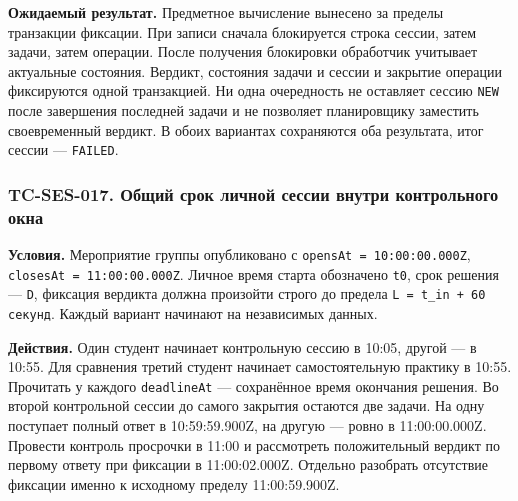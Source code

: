 \documentclass[12pt,a4paper]{article}
\begin{document}
\textbf{Ожидаемый результат.} Предметное вычисление вынесено за пределы транзакции фиксации. При записи сначала блокируется строка сессии, затем задачи, затем операции. После получения блокировки обработчик учитывает актуальные состояния. Вердикт, состояния задачи и сессии и закрытие операции фиксируются одной транзакцией. Ни одна очередность не оставляет сессию \texttt{NEW} после завершения последней задачи и не позволяет планировщику заместить своевременный вердикт. В обоих вариантах сохраняются оба результата, итог сессии --- \texttt{FAILED}.

\subsubsection{TC-SES-017. Общий срок личной сессии внутри контрольного окна}\label{tc-ses-017-ux43eux431ux449ux438ux439-ux441ux440ux43eux43a-ux43bux438ux447ux43dux43eux439-ux441ux435ux441ux441ux438ux438-ux432ux43dux443ux442ux440ux438-ux43aux43eux43dux442ux440ux43eux43bux44cux43dux43eux433ux43e-ux43eux43aux43dux430}

\hypertarget{tc-ses-017-общий-срок-личной-сессии-внутри-контрольного-окна}{}

\hypertarget{tc-ses-017}{}

\textbf{Условия.} Мероприятие группы опубликовано с \texttt{opens\allowbreak{}At =\allowbreak{} 10:00:00.\allowbreak{}000Z}, \texttt{closes\allowbreak{}At =\allowbreak{} 11:00:00.\allowbreak{}000Z}. Личное время старта обозначено \texttt{t0}, срок решения --- \texttt{D}, фиксация вердикта должна произойти строго до предела \texttt{L =\allowbreak{} t\_\allowbreak{}in + 60 секунд}. Каждый вариант начинают на независимых данных.

\textbf{Действия.} Один студент начинает контрольную сессию в 10:05, другой --- в 10:55. Для сравнения третий студент начинает самостоятельную практику в 10:55. Прочитать у каждого \texttt{deadlineAt} --- сохранённое время окончания решения. Во второй контрольной сессии до самого закрытия остаются две задачи. На одну поступает полный ответ в 10:59:59.900Z, на другую --- ровно в 11:00:00.000Z. Провести контроль просрочки в 11:00 и рассмотреть положительный вердикт по первому ответу при фиксации в 11:00:02.000Z. Отдельно разобрать отсутствие фиксации именно к исходному пределу 11:00:59.900Z.
\end{document}
